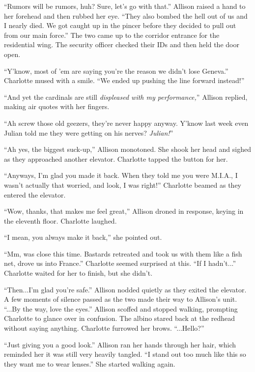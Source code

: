 \begin{Standard}
``Rumors will be rumors, huh? Sure, let's go with that.'' Allison raised a hand
to her forehead and then rubbed her eye. ``They also bombed the hell out of us
and I nearly died. We got caught up in the pincer before they decided to pull
out from our main force.'' The two came up to the corridor entrance for the
residential wing. The security officer checked their IDs and then held the door
open.

``Y'know, most of 'em are saying you're the reason we didn't lose Geneva.''
Charlotte mused with a smile. ``We ended up pushing the line forward instead!''

``And yet the cardinals are still \emph{displeased with my performance,}''
Allison replied, making air quotes with her fingers.

``Ah screw those old geezers, they're never happy anyway. Y'know last week even
Julian told me they were getting on his nerves? \emph{Julian!}''

``Ah yes, the biggest suck-up,'' Allison monotoned. She shook her head and sighed
as they approached another elevator. Charlotte tapped the button for her.

``Anyways, I'm glad you made it back. When they told me you were M.I.A., I wasn't
actually that worried, and look, I was right!'' Charlotte beamed as they entered the
elevator.

``Wow, thanks, that makes me feel great,'' Allison droned in response, keying in
the eleventh floor. Charlotte laughed.

``I mean, you always make it back,'' she pointed out.

``Mm, was close this time. Bastards retreated and took us with them like a fish net,
drove us into France.'' Charlotte seemed surprised at this. ``If I hadn't...''
Charlotte waited for her to finish, but she didn't.

``Then...I'm glad you're safe.'' Allison nodded quietly as they exited the elevator.
A few moments of silence passed as the two made their way to Allison's unit.
``...By the way, love the eyes.'' Allison scoffed and stopped walking, prompting
Charlotte to glance over in confusion. The albino stared back at the redhead
without saying anything. Charlotte furrowed her brows. ``...Hello?''

``Just giving you a good look.'' Allison ran her hands through her hair, which reminded
her it was still very heavily tangled. ``I stand out too much like this so they want
me to wear lenses.'' She started walking again.


\end{Standard}
